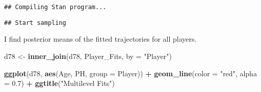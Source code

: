 \documentclass[
]{book}
\newenvironment{Shaded}{\begin{snugshade}}{\end{snugshade}}
\newcommand{\DataTypeTok}[1]{\textcolor[rgb]{0.13,0.29,0.53}{#1}}
\newcommand{\DecValTok}[1]{\textcolor[rgb]{0.00,0.00,0.81}{#1}}
\newcommand{\FloatTok}[1]{\textcolor[rgb]{0.00,0.00,0.81}{#1}}
\newcommand{\KeywordTok}[1]{\textcolor[rgb]{0.13,0.29,0.53}{\textbf{#1}}}
\newcommand{\NormalTok}[1]{#1}
\newcommand{\OperatorTok}[1]{\textcolor[rgb]{0.81,0.36,0.00}{\textbf{#1}}}
\newcommand{\StringTok}[1]{\textcolor[rgb]{0.31,0.60,0.02}{#1}}
\begin{document}
\begin{verbatim}
## Compiling Stan program...
\end{verbatim}

\begin{verbatim}
## Start sampling
\end{verbatim}

I find posterior means of the fitted trajectories for all players.

\begin{Shaded}
\end{Shaded}

\begin{Shaded}
\begin{Highlighting}[]
\NormalTok{d78 <-}\StringTok{ }\KeywordTok{inner_join}\NormalTok{(d78, Player_Fits, }\DataTypeTok{by =} \StringTok{"Player"}\NormalTok{)}
\end{Highlighting}
\end{Shaded}

\begin{Shaded}
\end{Shaded}

\begin{Shaded}
\begin{Highlighting}[]
\KeywordTok{ggplot}\NormalTok{(d78, }\KeywordTok{aes}\NormalTok{(Age, PH, }\DataTypeTok{group =}\NormalTok{ Player)) }\OperatorTok{+}
\StringTok{  }\KeywordTok{geom_line}\NormalTok{(}\DataTypeTok{color =} \StringTok{"red"}\NormalTok{, }\DataTypeTok{alpha =} \FloatTok{0.7}\NormalTok{) }\OperatorTok{+}
\StringTok{  }\KeywordTok{ggtitle}\NormalTok{(}\StringTok{"Multilevel Fits"}\NormalTok{) }
\end{Highlighting}
\end{Shaded}
\end{document}
